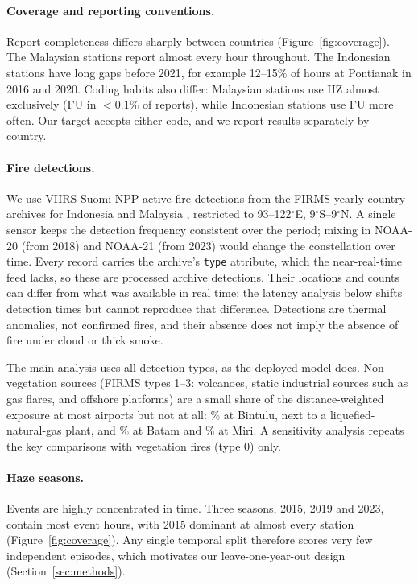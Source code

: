 \paragraph{Coverage and reporting conventions.}
Report completeness differs sharply between countries (Figure~\ref{fig:coverage}). The Malaysian
stations report almost every hour throughout. The Indonesian stations have long gaps before 2021,
for example 12--15\% of hours at Pontianak in 2016 and 2020. Coding habits also differ: Malaysian
stations use HZ almost exclusively (FU in $<0.1\%$ of reports), while Indonesian stations use FU
more often. Our target accepts either code, and we report results separately by country.

\paragraph{Fire detections.}
We use VIIRS Suomi NPP active-fire detections from the FIRMS yearly country archives for Indonesia
and Malaysia \citep{firms}, restricted to 93--122$^\circ$E, 9$^\circ$S--9$^\circ$N. A single
sensor keeps the detection frequency consistent over the period; mixing in NOAA-20 (from 2018) and
NOAA-21 (from 2023) would change the constellation over time. Every record carries the archive's
\texttt{type} attribute, which the near-real-time feed lacks, so these are processed archive
detections. Their locations and counts can differ from what was available in real time; the
latency analysis below shifts detection times but cannot reproduce that difference. Detections
are thermal anomalies, not confirmed fires, and their absence does not imply the absence of fire
under cloud or thick smoke.

The main analysis uses all detection types, as the deployed model does. Non-vegetation sources
(FIRMS types 1--3: volcanoes, static industrial sources such as gas flares, and offshore
platforms) are a small share of the distance-weighted exposure at most airports but not at all:
\% at Bintulu, next to a liquefied-natural-gas plant, and
\% at Batam and \% at Miri. A sensitivity analysis repeats
the key comparisons with vegetation fires (type 0) only.

\paragraph{Haze seasons.}
Events are highly concentrated in time. Three seasons, 2015, 2019 and 2023, contain most event
hours, with 2015 dominant at almost every station (Figure~\ref{fig:coverage}). Any single temporal
split therefore scores very few independent episodes, which motivates our leave-one-year-out
design (Section~\ref{sec:methods}).

